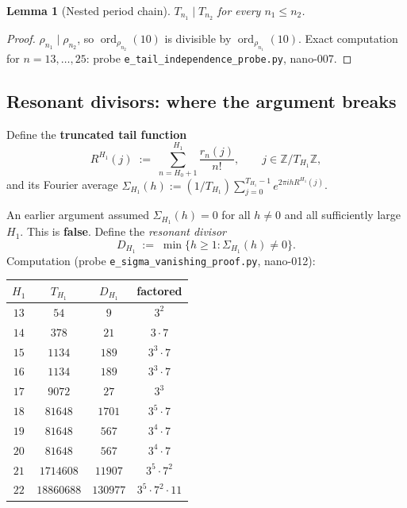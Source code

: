 \documentclass[
]{article}
\newtheorem{lemma}[theorem]{Lemma}
\begin{document}
\begin{lemma}[Nested period chain]\label{lem:nested-chain}
$T_{n_1}\mid T_{n_2}$ for every $n_1\le n_2$.
\end{lemma}

\begin{proof}
$\rho_{n_1}\mid\rho_{n_2}$, so
$\operatorname{ord}_{\rho_{n_2}}(10)$ is divisible by
$\operatorname{ord}_{\rho_{n_1}}(10)$.
Exact computation for $n=13,\ldots,25$: probe
\texttt{e\_tail\_independence\_probe.py}, nano-007.
\end{proof}

\subsection{Resonant divisors: where the argument breaks}
\label{sec:aci-resonant}

Define the \textbf{truncated tail function}
\[
  R^{H_1}(j) \;:=\; \sum_{n=H_0+1}^{H_1} \frac{r_n(j)}{n!},
  \qquad j\in\mathbb{Z}/T_{H_1}\mathbb{Z},
\]
and its Fourier average
$\Sigma_{H_1}(h) := (1/T_{H_1})\sum_{j=0}^{T_{H_1}-1} e^{2\pi i h R^{H_1}(j)}$.

An earlier argument assumed $\Sigma_{H_1}(h)=0$ for all $h\ne 0$ and
all sufficiently large $H_1$.  This is \textbf{false}.  Define the
\emph{resonant divisor}
\[
  D_{H_1} \;:=\; \min\bigl\{h\ge 1 : \Sigma_{H_1}(h)\ne 0\bigr\}.
\]
Computation (probe \texttt{e\_sigma\_vanishing\_proof.py}, nano-012):

\begin{center}
\begin{tabular}{cccc}
\toprule
$H_1$ & $T_{H_1}$ & $D_{H_1}$ & factored \\
\midrule
$13$ & $54$       & $9$     & $3^2$       \\
$14$ & $378$      & $21$    & $3\cdot7$   \\
$15$ & $1134$     & $189$   & $3^3\cdot7$ \\
$16$ & $1134$     & $189$   & $3^3\cdot7$ \\
$17$ & $9072$     & $27$    & $3^3$       \\
$18$ & $81648$    & $1701$  & $3^5\cdot7$ \\
$19$ & $81648$    & $567$   & $3^4\cdot7$ \\
$20$ & $81648$    & $567$   & $3^4\cdot7$ \\
$21$ & $1714608$  & $11907$   & $3^5\cdot7^2$          \\
$22$ & $18860688$ & $130977$  & $3^5\cdot7^2\cdot 11$  \\
\bottomrule
\end{tabular}
\end{center}
\end{document}
